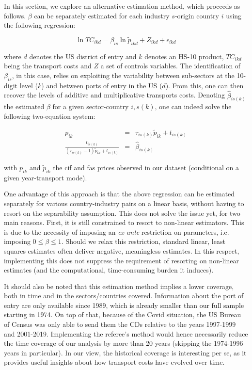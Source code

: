 \documentclass[11pt,twoside, authoryear]{elsarticle}
\begin{document}
In this section, we explore an alternative estimation method, which proceeds as follows. $\beta$ can be separately estimated for each industry $s$-origin country $i$ using the following regression:

\begin{equation}
\ln TC_{ikd} = \beta_{is}\ln \tilde{p}_{ikd} + Z_{ikd} +\epsilon_{ikd} \label{eq:estimation_ref1}
\end{equation}

where $d$ denotes the US district of entry and $k$ denotes an HS-10 product, $TC_{ikd}$ being the transport costs and $Z$ a set of controls variables. The identification of $\beta_{is}$, in this case, relies on exploiting the variability between sub-sectors at the 10-digit
level ($k$) and between ports of entry in the US ($d$). From this, one can then recover the levels of additive and multiplicative transports costs. Denoting $\widehat{\beta}_{is(k)}$ the estimated $\beta$ for a given sector-country $i,s(k)$, one can indeed solve the following two-equation system:

\begin{eqnarray*}
p_{ik} &=& \tau_{is(k)}\widetilde{p}_{ik} +t_{is(k)} \label{eq:system1}\\
\frac{t_{is(k)}}{(\tau_{is(k)}-1)\widetilde{p}_{ik}+ t_{is(k)}} &=& \widehat{\beta}_{is(k)}  \label{eq:system2}
\end{eqnarray*}


\noindent with $p_{ik}$ and $\widetilde{p}_{ik}$ the cif and fas prices observed in our dataset (conditional on a given year-transport mode).

One advantage of this approach is that the above regression can be estimated separately for various country-industry pairs on a linear basis, without having to resort on the separability assumption. This does not solve the issue yet, for two main reasons. First, it is still constrained to resort to non-linear estimators. This is due to the necessity of imposing an \textit{ex-ante} restriction on parameters, i.e. imposing $0 \leq  \beta \leq 1$. Should we relax this restriction, standard linear, least squares estimates often deliver negative, meaningless estimates. In this respect, implementing this does not suppress the requirement of resorting on non-linear estimates (and the computational, time-consuming burden it induces).

It should also be noted that this estimation method implies a lower coverage, both in time and in the sectors/countries covered. Information about the port of entry are only available since 1989, which is already smaller than our full sample starting in 1974. On top of that, because of the Covid situation, the US Bureau of Census was only able to send them the CDs relative to the years 1997-1999 and 2001-2019. Implementing the referee's method would hence necessarily reduce the time coverage of our analysis by more than 20 years (skipping the 1974-1996 years in particular). In our view, the historical coverage is interesting per se, as it provides useful insights about how transport costs have evolved over time.
\end{document}
